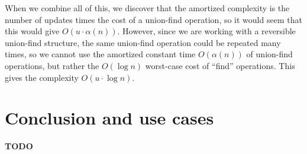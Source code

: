 \documentclass[a4paper,10pt]{article}
\begin{document}
When we combine all of this, we discover that the amortized complexity is the number of updates times the cost of a union-find operation, so it would seem that this would give $O(u\cdot\alpha(n))$. However, since we are working with a reversible union-find structure, the same union-find operation could be repeated many times, so we cannot use the amortized constant time $O(\alpha(n))$ of union-find operations, but rather the $O(\log n)$ worst-case cost of ``find'' operations. This gives the complexity $O(u \cdot \log n)$.

\section{Conclusion and use cases}
\textbf{TODO}
\end{document}
